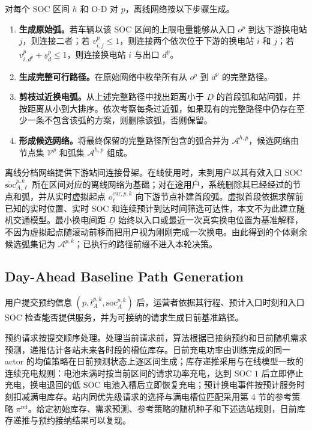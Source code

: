 \documentclass[12pt,a4paper,UTF8]{ctexart}
\begin{document}
对每个 SOC 区间 $h$ 和 O-D 对 $p$，离线网络按以下步骤生成。

\begin{enumerate}
  \item[\textbf{Step 1.}] \textbf{生成原始弧。}若车辆以该 SOC 区间的上限电量能够从入口 $o^p$ 到达下游换电站 $j$，则连接二者；若 $v_{i,j}^p\le1$，则连接两个依次位于下游的换电站 $i$ 和 $j$；若 $v_{i,d^p}^p+\underline s_d^p\le1$，则连接换电站 $i$ 与出口 $d^p$。

  \item[\textbf{Step 2.}] \textbf{生成完整可行路径。}在原始网络中枚举所有从 $o^p$ 到 $d^p$ 的完整路径。

  \item[\textbf{Step 3.}] \textbf{剪枝过近换电弧。}从上述完整路径中找出距离小于 $\underline D$ 的首段弧和站间弧，并按距离从小到大排序。依次考察每条过近弧，如果现有的完整路径中仍存在至少一条不包含该弧的方案，则删除该弧，否则保留。

  \item[\textbf{Step 4.}] \textbf{形成候选网络。}将最终保留的完整路径所包含的弧合并为 $\mathcal A^{h,p}$，候选网络由节点集 $\mathcal V^p$ 和弧集 $\mathcal A^{h,p}$ 组成。
\end{enumerate}

离线分档网络提供下游站间连接骨架。在线使用时，未到用户以其有效入口 SOC $\widetilde{\mathrm{soc}}_{A,\ell}^{p,k}$ 所在区间对应的离线网络为基础；对在途用户，系统删除其已经经过的节点和弧，并从实时虚拟起点 $o_\ell^{\mathrm{cur},p,k}$ 向下游节点补建首段弧。虚拟首段依据求解前已知的实时位置、实时 SOC 和连续预计到达时间筛选可达性，本文不为此建立随机交通模型。最小换电间距 $\underline D$ 始终以入口或最近一次真实换电位置为基准解释，不因为虚拟起点随滚动前移而把用户视为刚刚完成一次换电。由此得到的个体剩余候选弧集记为 $\mathcal A^{p,k}$；已执行的路径前缀不进入本轮决策。


\subsection{Day-Ahead Baseline Path Generation}

用户提交预约信息
$\left(p,\bar t_A^{p,k},\overline{\mathrm{soc}}_A^{p,k}\right)$
后，运营者依据其行程、预计入口时刻和入口 SOC 检查能否提供服务，并为可接纳的请求生成日前基准路径。

预约请求按提交顺序处理。处理当前请求前，算法根据已接纳预约和日前随机需求预测，递推估计各站未来各时段的槽位库存。日前充电功率由训练完成的同一 actor 的均值策略在日前预测状态上逐区间生成；库存递推采用与在线模型一致的连续充电规则：电池未满时按当前区间的请求功率充电，达到 SOC $1$ 后立即停止充电，换电退回的低 SOC 电池入槽后立即恢复充电；预计换电事件按预计服务时刻扣减满电库存。站内同优先级请求的选择与满电槽位匹配采用第 4 节的参考策略 $\pi^{\mathrm{ref}}$。给定初始库存、需求预测、参考策略的随机种子和下述选站规则，日前库存递推与预约接纳结果可以复现。
\end{document}
